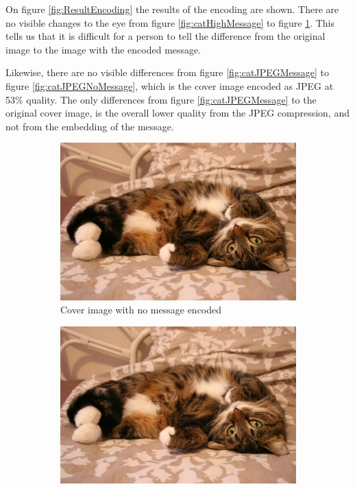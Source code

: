On figure \ref{fig:ResultEncoding} the results of the encoding are shown. There are no visible changes to the eye from figure \ref{fig:catHighMessage} to figure \ref{fig:catNoMessage}. This tells us that it is difficult for a person to tell the difference from the original image to the image with the encoded message. 

Likewise, there are no visible differences from figure \ref{fig:catJPEGMessage} to figure \ref{fig:catJPEGNoMessage}, which is the cover image encoded as JPEG at 53\% quality. The only differences from figure \ref{fig:catJPEGMessage} to the original cover image, is the overall lower quality from the JPEG compression, and not from the embedding of the message.

\begin{figure}[H]
    \centering
    \begin{subfigure}[b]{0.45\textwidth}
        \includegraphics[width=\textwidth]{figures/catToTest.jpg}
		\caption{Cover image with no message encoded}
		\label{fig:catNoMessage}
    \end{subfigure}
    \begin{subfigure}[b]{0.45\textwidth}
        \includegraphics[width=\textwidth]{figures/catToTestHighMessage.jpeg}

\end{subfigure}
\end{figure}
